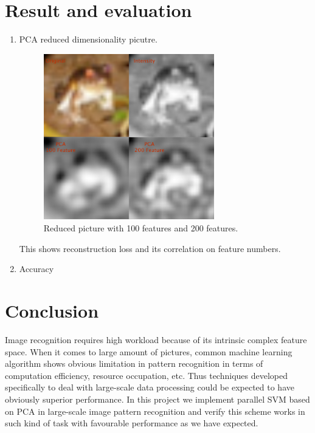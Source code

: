 \documentclass[a4paper]{article}
\begin{document}
\section{Result and evaluation}
\begin{enumerate}
\item PCA reduced dimensionality picutre.\\
\begin{figure}[!htb]
\centering
\includegraphics[width=0.7\textwidth]{pca}
\caption{\label{fig:pca}Reduced picture with 100 features and 200 features.}
\end{figure}
This shows reconstruction loss and its correlation on feature numbers.
\item Accuracy
\end{enumerate}

\section{Conclusion}
Image recognition requires high workload because of its intrinsic complex feature space. When it comes to large amount of pictures, common machine learning algorithm shows obvious limitation in pattern recognition in terms of computation efficiency, resource occupation, etc. Thus techniques developed specifically to deal with large-scale data processing could be expected to have obviously superior performance. In this project we implement parallel SVM based on PCA in large-scale image pattern recognition and verify this scheme works in such kind of task with favourable performance as we have expected. 
\end{document}
